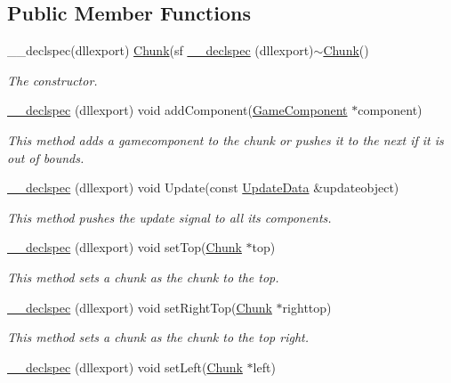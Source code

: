\subsection*{Public Member Functions}
\begin{DoxyCompactItemize}
\item 
\-\_\-\-\_\-declspec(dllexport) \hyperlink{class_chunk}{Chunk}(sf \hyperlink{class_chunk_ab44ec5e17f0ca6096892265ebf4a448d}{\-\_\-\-\_\-declspec} (dllexport)$\sim$\hyperlink{class_chunk}{Chunk}()
\begin{DoxyCompactList}\small\item\em The constructor. \end{DoxyCompactList}\item 
\hyperlink{class_chunk_ac74827ffc5c989b29d5ee985e0df4e96}{\-\_\-\-\_\-declspec} (dllexport) void add\-Component(\hyperlink{class_game_component}{Game\-Component} $\ast$component)
\begin{DoxyCompactList}\small\item\em This method adds a gamecomponent to the chunk or pushes it to the next if it is out of bounds. \end{DoxyCompactList}\item 
\hyperlink{class_chunk_acb635e1e8318e7b3a0accd4bcf49866d}{\-\_\-\-\_\-declspec} (dllexport) void Update(const \hyperlink{class_update_data}{Update\-Data} \&updateobject)
\begin{DoxyCompactList}\small\item\em This method pushes the update signal to all its components. \end{DoxyCompactList}\item 
\hyperlink{class_chunk_a27a4e5721687f011d6c52624d01eca8d}{\-\_\-\-\_\-declspec} (dllexport) void set\-Top(\hyperlink{class_chunk}{Chunk} $\ast$top)
\begin{DoxyCompactList}\small\item\em This method sets a chunk as the chunk to the top. \end{DoxyCompactList}\item 
\hyperlink{class_chunk_a164b8ab3a4d2e88b6d1bc5e6edfef100}{\-\_\-\-\_\-declspec} (dllexport) void set\-Right\-Top(\hyperlink{class_chunk}{Chunk} $\ast$righttop)
\begin{DoxyCompactList}\small\item\em This method sets a chunk as the chunk to the top right. \end{DoxyCompactList}\item 
\hyperlink{class_chunk_a5e25de330ba7c7c2e557a823d7a8505b}{\-\_\-\-\_\-declspec} (dllexport) void set\-Left(\hyperlink{class_chunk}{Chunk} $\ast$left)

\end{DoxyCompactItemize}
